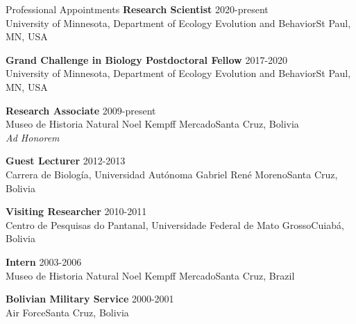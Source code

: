 \documentclass{resume} %
\begin{document}
\begin{rSection}{Professional Appointments}
{\bf Research Scientist} \hfill {2020-present} \\
{University of Minnesota, Department of Ecology Evolution and Behavior}\hfill {St Paul, MN, USA} 

{\bf Grand Challenge in Biology Postdoctoral Fellow} \hfill {2017-2020} \\
{University of Minnesota, Department of Ecology Evolution and Behavior}\hfill {St Paul, MN, USA} 

{\bf Research Associate} \hfill {2009-present} \\
{Museo de Historia Natural Noel Kempff Mercado}\hfill {Santa Cruz, Bolivia} \\
\emph{Ad Honorem} 

{\bf Guest Lecturer} \hfill {2012-2013} \\
{Carrera de Biología, Universidad Autónoma Gabriel René Moreno}\hfill {Santa Cruz, Bolivia} 

{\bf Visiting Researcher} \hfill {2010-2011} \\
{Centro de Pesquisas do Pantanal, Universidade Federal de Mato Grosso}\hfill {Cuiabá, Bolivia} 

{\bf Intern} \hfill {2003-2006} \\
{Museo de Historia Natural Noel Kempff Mercado}\hfill {Santa Cruz, Brazil} 

{\bf Bolivian Military Service} \hfill {2000-2001} \\
{Air Force}\hfill {Santa Cruz, Bolivia} 
\end{rSection}

\clearpage

\end{document}
